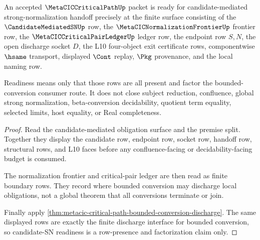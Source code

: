 \begin{theorem}
\label{thm:metacic-critical-path-candidate-sn-readiness}
An accepted $\MetaCICCriticalPathUp$ packet is ready for candidate-mediated strong-normalization handoff precisely at the finite surface consisting of the $\CandidateMediatedSNUp$ row, the $\MetaCICNormalizationFrontierUp$ frontier row, the $\MetaCICCriticalPairLedgerUp$ ledger row, the endpoint row $S,N$, the open discharge socket $D$, the L10 four-object exit certificate rows, componentwise $\hsame$ transport, displayed $\Cont$ replay, $\Pkg$ provenance, and the local naming row.

Readiness means only that those rows are all present and factor the bounded-conversion consumer route. It does not close subject reduction, confluence, global strong normalization, beta-conversion decidability, quotient term equality, selected limits, host equality, or Real completeness.
\end{theorem}
\begin{proof}
Read the candidate-mediated obligation surface and the premise split. Together they display the candidate row, endpoint row, socket row, handoff row, structural rows, and L10 faces before any confluence-facing or decidability-facing budget is consumed.

The normalization frontier and critical-pair ledger are then read as finite boundary rows. They record where bounded conversion may discharge local obligations, not a global theorem that all conversions terminate or join.

Finally apply \autoref{thm:metacic-critical-path-bounded-conversion-discharge}. The same displayed rows are exactly the finite discharge interface for bounded conversion, so candidate-SN readiness is a row-presence and factorization claim only.
\end{proof}

